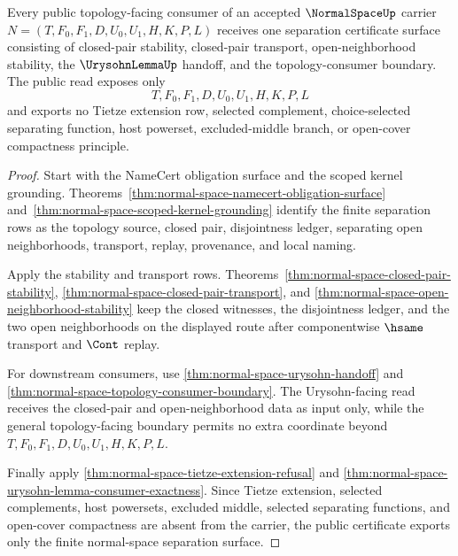\begin{theorem}
\label{thm:normal-space-public-separation-certificate}
Every public topology-facing consumer of an accepted $\NormalSpaceUp$ carrier $N=(T,F_0,F_1,D,U_0,U_1,H,K,P,L)$ receives one separation certificate surface consisting of closed-pair stability, closed-pair transport, open-neighborhood stability, the $\UrysohnLemmaUp$ handoff, and the topology-consumer boundary. The public read exposes only
$$
T,F_0,F_1,D,U_0,U_1,H,K,P,L
$$
and exports no Tietze extension row, selected complement, choice-selected separating function, host powerset, excluded-middle branch, or open-cover compactness principle.
\end{theorem}
\begin{proof}
Start with the NameCert obligation surface and the scoped kernel grounding. Theorems~\ref{thm:normal-space-namecert-obligation-surface} and~\ref{thm:normal-space-scoped-kernel-grounding} identify the finite separation rows as the topology source, closed pair, disjointness ledger, separating open neighborhoods, transport, replay, provenance, and local naming.

Apply the stability and transport rows. Theorems~\ref{thm:normal-space-closed-pair-stability}, \ref{thm:normal-space-closed-pair-transport}, and \ref{thm:normal-space-open-neighborhood-stability} keep the closed witnesses, the disjointness ledger, and the two open neighborhoods on the displayed route after componentwise $\hsame$ transport and $\Cont$ replay.

For downstream consumers, use \autoref{thm:normal-space-urysohn-handoff} and \autoref{thm:normal-space-topology-consumer-boundary}. The Urysohn-facing read receives the closed-pair and open-neighborhood data as input only, while the general topology-facing boundary permits no extra coordinate beyond $T,F_0,F_1,D,U_0,U_1,H,K,P,L$.

Finally apply \autoref{thm:normal-space-tietze-extension-refusal} and \autoref{thm:normal-space-urysohn-lemma-consumer-exactness}. Since Tietze extension, selected complements, host powersets, excluded middle, selected separating functions, and open-cover compactness are absent from the carrier, the public certificate exports only the finite normal-space separation surface.
\end{proof}



